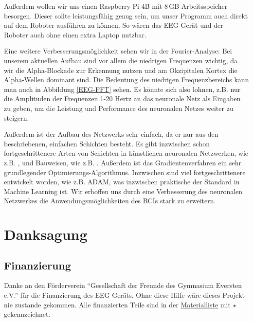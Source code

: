 \documentclass[11pt]{scrartcl}
\begin{document}
	Außerdem wollen wir uns einen Raspberry Pi 4B mit 8\,GB Arbeitsspeicher besorgen. Dieser sollte leistungsfähig genug sein, um unser Programm auch direkt auf dem Roboter ausführen zu können. So wären das EEG-Gerät und der Roboter auch ohne einen extra Laptop nutzbar.

	
	Eine weitere Verbesserungsmöglichkeit sehen wir in der Fourier-Analyse:
	Bei unserem aktuellen Aufbau sind vor allem die niedrigen Frequenzen wichtig, da wir die Alpha-Blockade zur Erkennung nutzen und am Okzipitalen Kortex die Alpha-Wellen dominant sind. Die Bedeutung des niedrigen Frequenzbereichs kann man auch in Abbildung \ref{EEG-FFT} sehen. Es könnte sich also lohnen, z.B. nur die Amplituden der Frequenzen 1-20 Hertz an das neuronale Netz als Eingaben zu geben, um die Leistung und Performance des neuronalen Netzes weiter zu steigern. 

	Außerdem ist der Aufbau des Netzwerks sehr einfach, da er nur aus den beschriebenen, einfachen  Schichten besteht. Es gibt inzwischen schon fortgeschrittenere Arten von Schichten in künstlichen neuronalen Netzwerken, wie z.B. , und Bauweisen, wie z.B. . Außerdem ist das Gradientenverfahren ein sehr grundlegender Optimierungs-Algorithmus. Inzwischen sind viel fortgeschrittenere entwickelt worden, wie z.B. ADAM, was inzwischen praktische der Standard in Machine Learning ist. Wir erhoffen uns durch eine Verbesserung des neuronalen Netzwerkes die Anwendungsmöglichkeiten des BCIs stark zu erweitern.

	\newpage

	\section{Danksagung}

	\subsection{Finanzierung} \label{Foerderverein}

	Danke an den Förderverein \enquote{Gesellschaft der Freunde des Gymnasium Eversten e.V.} für die Finanzierung des EEG-Geräts. Ohne diese Hilfe wäre dieses Projekt nie zustande gekommen. Alle finanzierten Teile sind in der \hyperref[Materialien]{Materialliste} mit $\star$ gekennzeichnet. 
\end{document}
